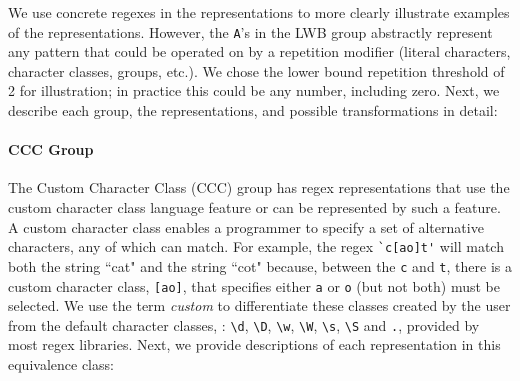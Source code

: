 We use concrete regexes in the representations to more clearly illustrate examples of the representations. However, the \verb!A!'s in the LWB group abstractly represent any pattern that could be operated on by a repetition modifier (literal characters, character classes, groups, etc.).   We chose the lower bound repetition threshold of  2 for illustration; in practice this could be any number, including zero.
Next, we describe each group, the representations, and possible transformations in detail:

\paragraph{CCC Group}
The Custom Character Class (CCC) group has regex representations that use the custom character class language feature or can be represented by such a feature.
A custom character class enables a programmer to specify a set of alternative characters, any of which can match.  For example, the regex \verb!`c[ao]t'! will match both the string ``cat" and the string ``cot" because, between the \verb!c! and \verb!t!, there is a custom character class, \verb![ao]!, that specifies either \verb!a! or \verb!o! (but not both) must be selected.  We use the term \emph{custom} to differentiate these classes created by the user from the default character classes, : \verb!\d!, \verb!\D!, \verb!\w!, \verb!\W!, \verb!\s!, \verb!\S! and \verb!.!,  provided by most regex libraries.
Next, we provide descriptions of each representation in this equivalence class:

